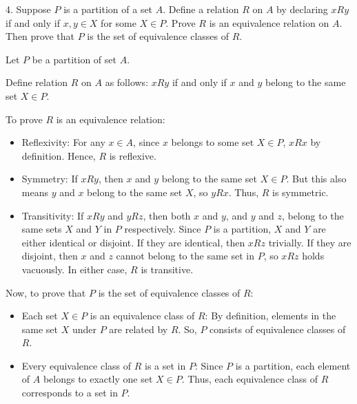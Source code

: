 \documentclass{article}
\begin{document}
\begin{exercise}{}{}{4. Suppose $P$ is a partition of a set $A$. Define a
		relation $R$ on $A$ by declaring $x R y$ if and only if $x, y \in X$ for
		some $X \in P$. Prove $R$ is an equivalence relation on $A$. Then prove that $P$
		is the set of equivalence classes of $R$.}
	\begin{alist}
		\item Let $P$ be a partition of set $A$.
		\item Define relation $R$ on $A$ as follows: $x R y$ if and only if $x$
		and $y$ belong to the same set $X \in P$.
		\item To prove $R$ is an equivalence relation:
		\begin{itemize}
			\item Reflexivity: For any $x \in A$, since $x$ belongs to some set
			      $X \in P$, $x R x$ by definition. Hence, $R$ is reflexive.
			\item Symmetry: If $x R y$, then $x$ and $y$ belong to the same set
			      $X \in P$. But this also means $y$ and $x$ belong to the same
			      set $X$, so $y R x$. Thus, $R$ is symmetric.
			\item Transitivity: If $x R y$ and $y R z$, then both $x$ and $y$,
			      and $y$ and $z$, belong to the same sets $X$ and $Y$ in $P$
			      respectively. Since $P$ is a partition, $X$ and $Y$ are either
			      identical or disjoint. If they are identical, then $x R z$
			      trivially. If they are disjoint, then $x$ and $z$ cannot belong
			      to the same set in $P$, so $x R z$ holds vacuously. In either
			      case, $R$ is transitive.
		\end{itemize}
		\item Now, to prove that $P$ is the set of equivalence classes of $R$:
		\begin{itemize}
			\item Each set $X \in P$ is an equivalence class of $R$: By
			      definition, elements in the same set $X$ under $P$ are related
			      by $R$. So, $P$ consists of equivalence classes of $R$.
			\item Every equivalence class of $R$ is a set in $P$: Since $P$ is a
			      partition, each element of $A$ belongs to exactly one set $X \in
				      P$. Thus, each equivalence class of $R$ corresponds to a set in
			      $P$.
		\end{itemize}
	\end{alist}
\end{exercise}{}{}
\end{document}

